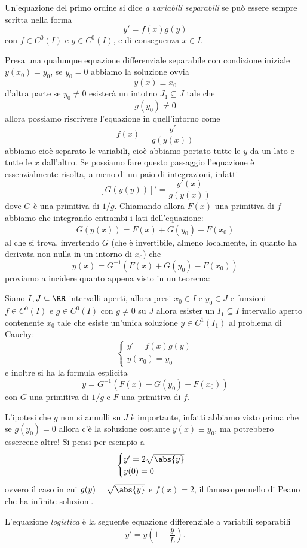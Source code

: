 \documentclass[11pt]{scrartcl}
\begin{document}
	\begin{definition}
		Un'equazione del primo ordine si dice \textit{a variabili separabili} se può essere sempre scritta nella forma
		$$y'=f(x)g(y)$$
		con $f\in C^0(I)$ e $g\in C^0(I)$, e di conseguenza $x\in I$.
	\end{definition}
	Presa una qualunque equazione differenziale separabile con condizione iniziale $y(x_0)=y_0$, se $y_0=0$ abbiamo la soluzione ovvia
	$$y(x)\equiv x_0$$
	d'altra parte se $y_0\ne 0$ esisterà un intotno $J_1\subseteq J$ tale che
	$$g(y_0)\ne 0$$
	allora possiamo riscrivere l'equazione in quell'intorno come
	$$f(x)=\frac{y'}{g(y(x))}$$
	abbiamo cioè separato le variabili, cioè abbiamo portato tutte le $y$ da un lato e tutte le $x$ dall'altro. Se possiamo fare questo passaggio l'equazione è essenzialmente risolta, a meno di un paio di integrazioni, infatti
	$$[G(y(y))]'=\frac{y'(x)}{g(y(x))}$$
	dove $G$ è una primitiva di $1/g$. Chiamando allora $F(x)$ una primitiva di $f$ abbiamo che integrando entrambi i lati dell'equazione:
	$$G(y(x))=F(x)+G(y_0)-F(x_0)$$
	al che si trova, invertendo $G$ (che è invertibile, almeno localmente, in quanto ha derivata non nulla in un intorno di $x_0$) che
	$$y(x)=G^{-1}\left(F(x)+G(y_0)-F(x_0)\right)$$	
	proviamo a incidere quanto appena visto in un teorema:
	\begin{theorem}
		Siano $I,J\subseteq\RR$ intervalli aperti, allora presi $x_0\in I$ e $y_0\in J$ e funzioni $f\in C^0(I)$ e $g\in C^0(I)$ con $g\ne 0$ su $J$ allora esister un $I_1\subseteq I$ intervallo aperto contenente $x_0$ tale che esiste un'unica soluzione $y\in C^1(I_1)$ al problema di Cauchy:
		$$
		\begin{cases}
			y'=f(x)g(y) \\
			y(x_0)=y_0
		\end{cases}
		$$
		e inoltre si ha la formula esplicita
		$$y=G^{-1}\left(F(x)+G(y_0)-F(x_0)\right)$$
		con $G$ una primitiva di $1/g$ e $F$ una primitiva di $f$.
	\end{theorem}
	\begin{remark}
		L'ipotesi che $g$ non si annulli su $J$ è importante, infatti abbiamo visto prima che se $g(y_0)=0$ allora c'è la soluzione costante $y(x)\equiv y_0$, ma potrebbero essercene altre! Si pensi per esempio a
		$$
		\begin{cases}
			y'= 2\sqrt{\abs{y}} \\
			y(0)=0
		\end{cases}
		$$
		ovvero il caso in cui $g(y)=\sqrt{\abs{y}}$ e $f(x)=2$, il famoso pennello di Peano che ha infinite soluzioni.
	\end{remark}
	\begin{example}
		L'equazione \textit{logistica} è la seguente equazione differenziale a variabili separabili
		$$y'=y\left(1-\frac{y}{L}\right).$$
	\end{example}
\end{document}
